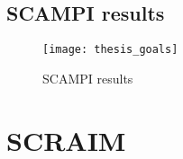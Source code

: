 \subsection{SCAMPI results}
\begin{figure}[h]
	\begin{center}
		\leavevmode
		\texttt{[image: thesis\_goals]}
		\caption{SCAMPI results}
		\label{fig:scampiresults}
	\end{center}
\end{figure}

\section{SCRAIM}
